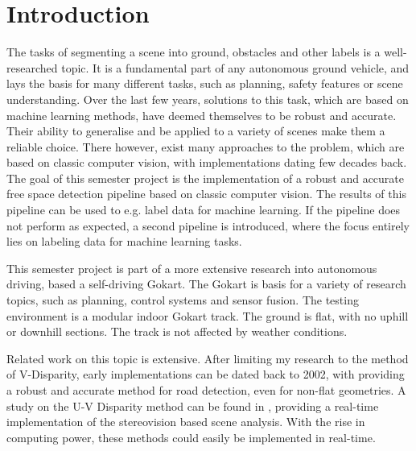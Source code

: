 
\chapter{Introduction}
\label{chp:Introduction}

The tasks of segmenting a scene into ground, obstacles and other labels is a well-researched topic. It is a fundamental part of any autonomous ground vehicle, and lays the basis for many different tasks, such as planning, safety features or scene understanding. Over the last few years, solutions to this task, which are based on machine learning methods, have deemed themselves to be robust and accurate. Their ability to generalise and be applied to a variety of scenes make them a reliable choice. There however, exist many approaches to the problem, which are based on classic computer vision, with implementations dating few decades back. \newline
The goal of this semester project is the implementation of a robust and accurate free space detection pipeline based on classic computer vision. The results of this pipeline can be used to e.g. label data for machine learning. If the pipeline does not perform as expected, a second pipeline is introduced, where the focus entirely lies on labeling data for machine learning tasks. 

This semester project is part of a more extensive research into autonomous driving, based a self-driving Gokart. The Gokart is basis for a variety of research topics, such as planning, control systems and sensor fusion. The testing environment is a modular indoor Gokart track. The ground is flat, with no uphill or downhill sections. The track is not affected by weather conditions. \newline



Related work on this topic is extensive. After limiting my research to the method of V-Disparity, early implementations can be dated back to 2002, with \cite{V-disparity_nonflat} providing a robust and accurate method for road detection, even for non-flat geometries. A study on the U-V Disparity method can be found in \cite{Hu2005}, providing a real-time implementation of the stereovision based scene analysis. With the rise in computing power, these methods could easily be implemented in real-time. 